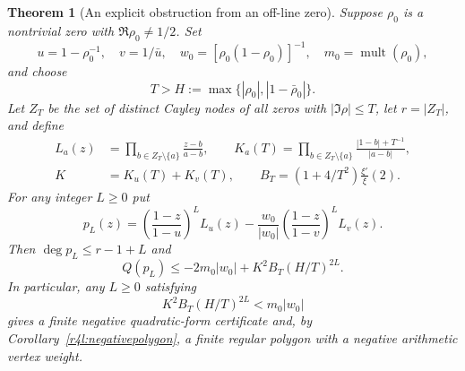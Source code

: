 \documentclass[11pt,a4paper]{article}
\newtheorem{theorem}{Theorem}[section]
\theoremstyle{definition}\newtheorem{definition}[theorem]{Definition}
\theoremstyle{remark}\newtheorem{remark}[theorem]{Remark}
\numberwithin{equation}{section}
\begin{document}
\begin{theorem}[An explicit obstruction from an off-line zero]
\label{r4l:offzero}
Suppose $\rho_0$ is a nontrivial zero with $\Re\rho_0\ne1/2$.
Set
\[
 u=1-\rho_0^{-1},\quad v=1/\bar u,
 \quad w_0=[\rho_0(1-\rho_0)]^{-1},
 \quad m_0=\operatorname{mult}(\rho_0),
\]
and choose
\[
 T>H:=\max\{|\rho_0|,|1-\bar\rho_0|\}.
\]
Let $Z_T$ be the set of distinct Cayley nodes of all zeros with
$|\Im\rho|\le T$, let $r=|Z_T|$, and define
\begin{align*}
 L_a(z)&=\prod_{b\in Z_T\setminus\{a\}}\frac{z-b}{a-b},\qquad
 K_a(T)=\prod_{b\in Z_T\setminus\{a\}}
             \frac{|1-b|+T^{-1}}{|a-b|},\\
 K&=K_u(T)+K_v(T),\qquad
 B_T=(1+4/T^2)\frac{\xi'}{\xi}(2).
\end{align*}
For any integer $L\ge0$ put
\begin{equation}\label{r4l:filter}
 p_L(z)=\left(\frac{1-z}{1-u}\right)^L L_u(z)
       -\frac{w_0}{|w_0|}
        \left(\frac{1-z}{1-v}\right)^L L_v(z).
\end{equation}
Then $\deg p_L\le r-1+L$ and
\begin{equation}\label{r4l:tailcertificate}
 Q(p_L)\le -2m_0|w_0|+K^2B_T(H/T)^{2L}.
\end{equation}
In particular, any $L\ge0$ satisfying
\begin{equation}\label{r4l:Lchoice}
 K^2B_T(H/T)^{2L}<m_0|w_0|
\end{equation}
gives a finite negative quadratic-form certificate and, by
Corollary~\ref{r4l:negativepolygon}, a finite regular polygon with a
negative arithmetic vertex weight.
\end{theorem}
\end{document}
